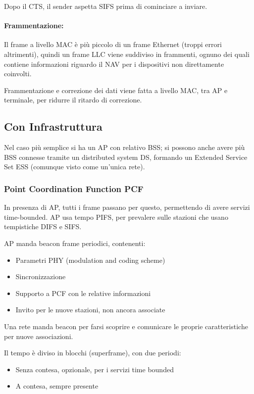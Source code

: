 Dopo il CTS, il sender aspetta SIFS prima di cominciare a inviare.

\paragraph{Frammentazione:} Il frame a livello MAC è più piccolo di un frame Ethernet (troppi errori altrimenti), quindi un frame LLC viene suddiviso in frammenti, ognuno dei quali contiene informazioni riguardo il NAV per i dispositivi non direttamente coinvolti. 

Frammentazione e correzione dei dati viene fatta a livello MAC, tra AP e terminale, per ridurre il ritardo di correzione.

\subsection{Con Infrastruttura}

Nel caso più semplice si ha un AP con relativo BSS; si possono anche avere più BSS connesse tramite un distributed system DS, formando un Extended Service Set ESS (comunque visto come un'unica rete).

\subsubsection{Point Coordination Function PCF}

In presenza di AP, tutti i frame passano per questo, permettendo di avere servizi time-bounded. AP usa tempo PIFS, per prevalere sulle stazioni che usano tempistiche DIFS e SIFS.

AP manda beacon frame periodici, contenenti:
\begin{itemize}
    \item Parametri PHY (modulation and coding scheme)
    
    \item Sincronizzazione
    
    \item Supporto a PCF con le relative informazioni 
    
    \item Invito per le nuove stazioni, non ancora associate
\end{itemize}

Una rete manda beacon per farsi scoprire e comunicare le proprie caratteristiche per nuove associazioni.

Il tempo è diviso in blocchi (superframe), con due periodi: 
\begin{itemize}
    \item Senza contesa, opzionale, per i servizi time bounded
    
    \item A contesa, sempre presente
\end{itemize}

